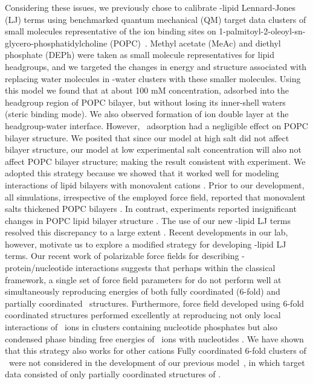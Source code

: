 Considering these issues, we previously chose to calibrate \mg-lipid Lennard-Jones (LJ) terms using 
benchmarked quantum mechanical (QM) target data clusters of small molecules representative of the
ion binding sites on 1-palmitoyl-2-oleoyl-sn-glycero-phosphatidylcholine (POPC)~\cite{saunders:2022}. 
Methyl acetate (MeAc) and diethyl phosphate (DEPh) were taken as small molecule representatives for lipid headgroups, 
and we targeted the changes in energy and structure associated with replacing water molecules in \mg-water clusters with these smaller molecules.  
Using this model we found that at about 100 mM concentration, \mg adsorbed into the headgroup region of POPC bilayer, 
but without losing its inner-shell waters (steric binding mode). We also observed formation of ion double layer at the headgroup-water interface.
However, \mg~adsorption had a negligible effect on POPC bilayer structure. We posited that since our model at 
high salt did not affect bilayer structure, our model at low experimental salt concentration will also not affect POPC bilayer structure; making the result consistent with experiment. 
We adopted this strategy because we showed that it worked well for modeling interactions of lipid bilayers with monovalent cations \cite{saunders:2022}. Prior to our development, all simulations, irrespective of the employed force field, reported that monovalent salts thickened POPC bilayers \cite{sachs:2004,melcr:2018,jurkiewicz:2012,kruczek:2017}. 
In contrast, experiments reported insignificant changes in POPC lipid bilayer structure \cite{pabst:2007:rigidification,petrache:2006:swelling}. 
The use of our new \na-lipid LJ terms resolved this discrepancy to a large extent \cite{saunders:2022}. 
Recent developments in our lab, however, motivate us to explore a modified strategy for developing \mg-lipid LJ terms. 
Our recent work of polarizable force fields for describing \mg-protein/nucleotide interactions \cite{julian:2023:mg} suggests that perhaps within the classical framework, a single set of force field parameters for \mg do not perform well at simultaneously reproducing 
energies of both fully coordinated (6-fold)
and partially coordinated \mg~structures. 
Furthermore, force field developed using 6-fold coordinated structures performed excellently at reproducing not only local interactions of 
\mg~ions in clusters containing nucleotide phosphates but also condensed phase binding free energies of \mg~ions with nucleotides \cite{julian:2023:mg}. We have shown that this strategy also works for other cations \cite{JACS2025} 
Fully coordinated 6-fold clusters of \mg~were not considered in the development of our previous \mg{} model~\cite{saunders:2024}, in which target data consisted of only partially coordinated structures of \mg.

